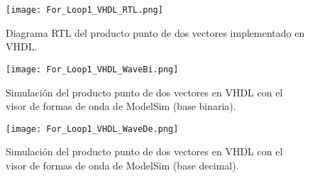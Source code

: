 \begin{figure}[ht]
	\centering
	\texttt{[image: For\_Loop1\_VHDL\_RTL.png]}
	\caption{Diagrama RTL del producto punto de dos vectores implementado en VHDL. \label{fig:for_loop1_vhdl_rtl}}
\end{figure}

\begin{figure}[ht]
	\centering
	\texttt{[image: For\_Loop1\_VHDL\_WaveBi.png]}
	\caption{Simulación del producto punto de dos vectores en VHDL con el visor de formas de onda de ModelSim (base binaria). \label{fig:for_loop1_vhdl_wavebi}}
\end{figure}

\begin{figure}[ht]
	\centering
	\texttt{[image: For\_Loop1\_VHDL\_WaveDe.png]}
	\caption{Simulación del producto punto de dos vectores en VHDL con el visor de formas de onda de ModelSim (base decimal). \label{fig:for_loop1_vhdl_wavede}}
\end{figure}